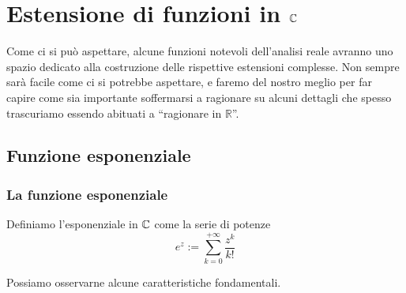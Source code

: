 
\chapter{Estensione di funzioni in $\mathbb{C}$}
Come ci si può aspettare, alcune funzioni notevoli dell'analisi reale avranno uno spazio dedicato alla costruzione delle rispettive estensioni complesse. Non sempre sarà facile come ci si potrebbe aspettare, e faremo del nostro meglio per far capire come sia importante soffermarsi a ragionare su alcuni dettagli che spesso trascuriamo essendo abituati a \enquote{ragionare in $\mathbb{R}$}.

\newpage

\section{Funzione esponenziale}
\subsection{\textcolor{AnComp}{\textbf{La funzione esponenziale}}}
\begin{definition}
	\label{defn:funzione-esponenziale}
	Definiamo l'esponenziale in $\mathbb{C}$ come la serie di potenze
	\begin{equation*}
		e^z := \sum^{+\infty}_{k=0} \frac{z^k}{k!}
	\end{equation*}
\end{definition}

Possiamo osservarne alcune caratteristiche fondamentali. 


